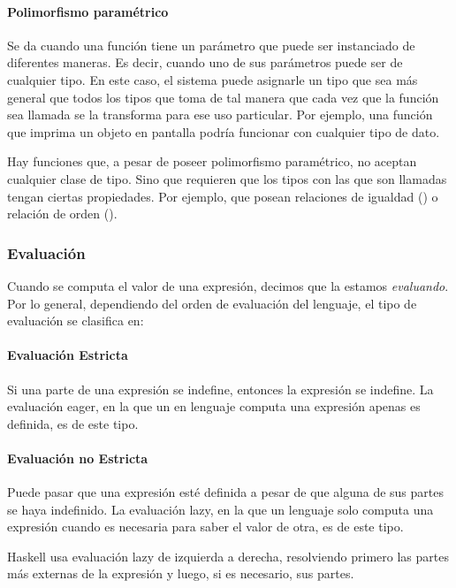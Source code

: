 \paragraph{Polimorfismo paramétrico} Se da cuando una función tiene un parámetro que puede ser instanciado de diferentes maneras. Es decir, cuando uno de sus parámetros puede ser de cualquier tipo. En este caso, el sistema puede asignarle un tipo que sea más general que todos los tipos que toma de tal manera que cada vez que la función sea llamada se la transforma para ese uso particular. Por ejemplo, una función que imprima un objeto en pantalla podría funcionar con cualquier tipo de dato.

Hay funciones que, a pesar de poseer polimorfismo paramétrico, no aceptan cualquier clase de tipo. Sino que requieren que los tipos con las que son llamadas tengan ciertas propiedades. Por ejemplo, que posean relaciones de igualdad () o relación de orden ().

\subsubsection{Evaluación}
Cuando se computa el valor de una expresión, decimos que la estamos \textit{evaluando}. Por lo general, dependiendo del orden de evaluación del lenguaje, el tipo de evaluación se  clasifica en:

\paragraph{Evaluación Estricta} Si una parte de una expresión se indefine, entonces la expresión se indefine. La evaluación eager, en la que un en lenguaje computa una expresión apenas es definida, es de este tipo. 

\paragraph{Evaluación no Estricta} Puede pasar que una expresión esté definida a pesar de que alguna de sus partes se haya indefinido. La evaluación lazy, en la que un lenguaje solo computa una expresión cuando es necesaria para saber el valor de otra, es de este tipo.

Haskell usa evaluación lazy de izquierda a derecha, resolviendo primero las partes más externas de la expresión y luego, si es necesario, sus partes.

